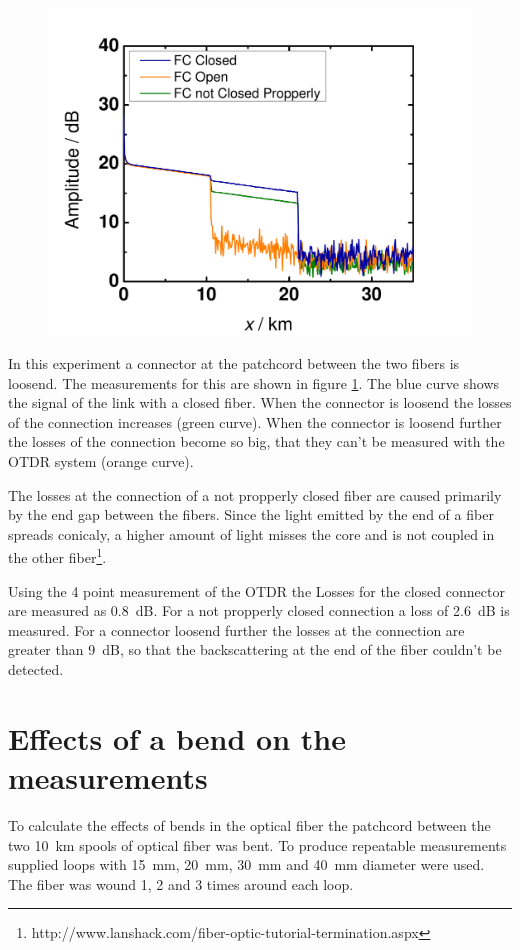 \begin{figure}%
\centering
\includegraphics[width=.8\columnwidth]{grafiken/Connector.pdf}%
\caption{}%
\label{fig:connector}%
\end{figure}

In this experiment a connector at the patchcord between the two fibers is loosend. The measurements for this are shown in figure \ref{fig:connector}. The blue curve shows the signal of the link with a closed fiber. When the connector is loosend the losses of the connection increases (green curve). When the connector is loosend further the losses of the connection become so big, that they can't be measured with the OTDR system (orange curve). 

The losses at the connection of a not propperly closed fiber are caused primarily by the end gap between the fibers. Since the light emitted by the end of a fiber spreads conicaly, a higher amount of light misses the core and is not coupled in the other fiber\footnote[4]{http://www.lanshack.com/fiber-optic-tutorial-termination.aspx}.

Using the 4 point measurement of the OTDR the Losses for the closed connector are measured as 0.8~dB. For a not propperly closed connection a loss of 2.6~dB is measured. For a connector loosend further the losses at the connection are greater than 9~dB, so that the backscattering at the end of the fiber couldn't be detected.

\section{Effects of a bend on the measurements}
To calculate the effects of bends in the optical fiber the patchcord between the two 10~km spools of optical fiber was bent. To produce repeatable measurements supplied loops with 15~mm, 20~mm, 30~mm and 40~mm diameter were used. The fiber was wound 1, 2 and 3 times around each loop. 

